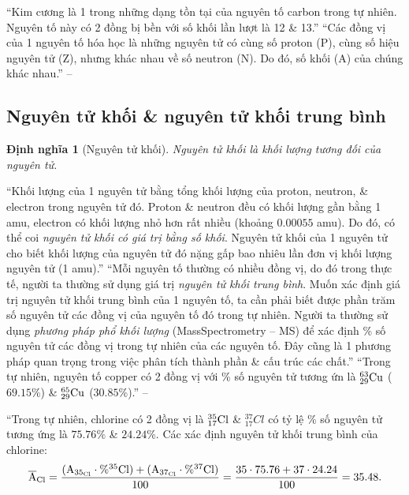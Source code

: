 \documentclass[oneside]{book}
\numberwithin{equation}{section}
\newtheorem{dinhnghia}{Định nghĩa}[section]
\begin{document}
``Kim cương là 1 trong những dạng tồn tại của nguyên tố carbon trong tự nhiên. Nguyên tố này có 2 đồng bị bền với số khối lần lượt là 12 \& 13.'' ``Các đồng vị của 1 nguyên tố hóa học là những nguyên tử có cùng số proton (P), cùng số hiệu nguyên tử (Z), nhưng khác nhau về số neutron (N). Do đó, số khối (A) của chúng khác nhau.'' -- \cite[p. 23]{SGK_Hoa_Hoc_10_Chan_Troi_Sang_Tao}

\subsection{Nguyên tử khối \& nguyên tử khối trung bình}

\begin{dinhnghia}[Nguyên tử khối]
	\emph{Nguyên tử khối} là khối lượng tương đối của nguyên tử.
\end{dinhnghia}
``Khối lượng của 1 nguyên tử bằng tổng khối lượng của proton, neutron, \& electron trong nguyên tử đó. Proton \& neutron đều có khối lượng gần bằng 1 amu, electron có khối lượng nhỏ hơn rất nhiều (khoảng $0.00055$ amu). Do đó, có thể coi \textit{nguyên tử khối có giá trị bằng số khối}. Nguyên tử khối của 1 nguyên tử cho biết khối lượng của nguyên tử đó nặng gấp bao nhiêu lần đơn vị khối lượng nguyên tử (1 amu).'' ``Mỗi nguyên tố thường có nhiều đồng vị, do đó trong thực tế, người ta thường sử dụng giá trị \textit{nguyên tử khối trung bình}. Muốn xác định giá trị nguyên tử khối trung bình của 1 nguyên tố, ta cần phải biết được phần trăm số nguyên tử các đồng vị của nguyên tố đó trong tự nhiên. Người ta thường sử dụng \textit{phương pháp phổ khối lượng} (MassSpectrometry -- MS) để xác định \% số nguyên tử các đồng vị trong tự nhiên của các nguyên tố. Đây cũng là 1 phương pháp quan trọng trong việc phân tích thành phần \& cấu trúc các chất.'' ``Trong tự nhiên, nguyên tố copper có 2 đồng vị với \%  số nguyên tử tương ứn là $\rm{}_{29}^{63}Cu$ ($69.15$\%) \& $\rm{}_{29}^{65}Cu$ ($30.85$\%).'' -- \cite[p. 23]{SGK_Hoa_Hoc_10_Chan_Troi_Sang_Tao}

``Trong tự nhiên, chlorine có 2 đồng vị là $\rm{}_{17}^{35}Cl$ \& ${}_{17}^{37}Cl$ có tỷ lệ \% số nguyên tử tương ứng là $75.76\%$ \& $24.24$\%. Các xác định nguyên tử khối trung bình của chlorine:
\begin{align*}
	\rm\overline{A}_{Cl} = \frac{(A_{35_{Cl}}\cdot\%^{35}Cl) + (A_{37_{Cl}}\cdot\%^{37}Cl)}{100} = \frac{35\cdot 75.76 + 37\cdot 24.24}{100} = 35.48.
\end{align*}
\end{document}
